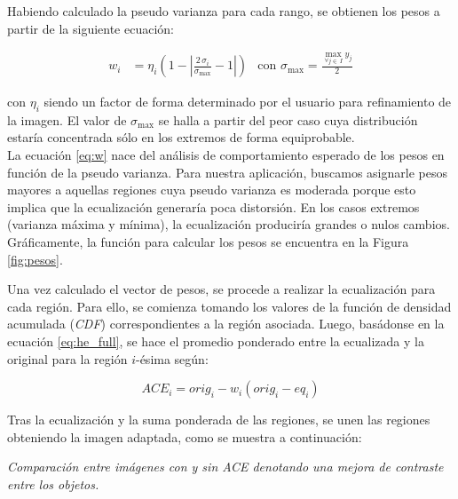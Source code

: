 Habiendo calculado la pseudo varianza para cada rango, se obtienen los pesos a
partir de la siguiente ecuación:

\begin{align} \label{eq:w}
	w_i &= \eta_i \left(1 - \left|\frac{2 \,\sigma_i}{\sigma_{\max}} -1 \right|\right) & \text{con }{\sigma_{\max} = \frac{\max\limits_{\forall j \in \, I}{y_j}}{2}}
\end{align}

con $\eta_i$ siendo un factor de forma determinado por el usuario para
refinamiento de la imagen. El valor de $\sigma_{\max}$ se halla a partir del
peor caso cuya distribución estaría concentrada sólo en los extremos de forma
equiprobable.\\

La ecuación \eqref{eq:w} nace del análisis de comportamiento esperado de los
pesos en función de la pseudo varianza. Para nuestra aplicación, buscamos
asignarle pesos mayores a aquellas regiones cuya pseudo varianza es moderada
porque esto implica que la ecualización generaría poca distorsión. En los casos
extremos (varianza máxima y mínima), la ecualización produciría grandes o nulos
cambios. Gráficamente, la función para calcular los pesos se encuentra en la
Figura \ref{fig:pesos}.


Una vez calculado el vector de pesos, se procede a realizar la ecualización
para cada región. Para ello, se comienza tomando los valores de la función
de densidad acumulada (\emph{CDF}) correspondientes a la región asociada. Luego,
basádonse en la ecuación \eqref{eq:he_full}, se hace el promedio ponderado entre
la ecualizada y la original para la región $i$-ésima según:

\begin{equation} \label{eq:ace}
	\textit{ACE}_i = \textit{orig}_i - w_i \left(\textit{orig}_i - \textit{eq}_i\right)
\end{equation}

Tras la ecualización y la suma ponderada de las regiones, se unen las regiones
obteniendo la imagen adaptada, como se muestra a continuación:

\noindent
\begin{minipage}{\columnwidth}
	\makeatletter
	\newcommand{\@captype}{figure}
	\makeatother
	\centering
		\qquad%
	\caption{\emph{Comparación entre imágenes con y sin ACE denotando una mejora de contraste entre los objetos.}}
\end{minipage}
